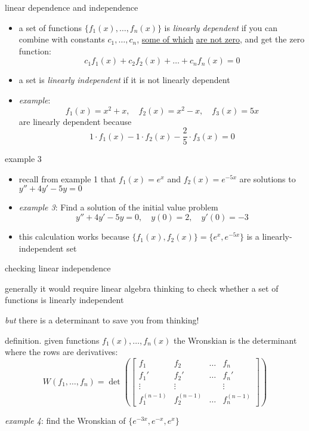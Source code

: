 \documentclass{beamer}
\begin{document}
\begin{frame}{linear dependence and independence}

\begin{itemize}
\item a set of functions $\{f_1(x),\dots,f_n(x)\}$ is \emph{linearly dependent} if you can combine with constants $c_1,\dots,c_n$, \underline{some of which} \underline{are not zero}, and get the zero function:
    $$c_1 f_1(x) + c_2 f_2(x) + \dots + c_n f_n(x) = 0$$
\item a set is \emph{linearly independent} if it is not linearly dependent
\item \emph{example}:
    $$f_1(x) = x^2 + x, \quad f_2(x) = x^2 - x, \quad f_3(x) = 5x$$
are linearly dependent because
    $$1\cdot f_1(x) - 1\cdot f_2(x) - \frac{2}{5}\cdot f_3(x) = 0$$
\end{itemize}
\end{frame}


\begin{frame}{example 3}

\begin{itemize}
\item recall from example 1 that $f_1(x)=e^x$ and $f_2(x)=e^{-5x}$ are solutions to $y'' + 4 y' - 5 y = 0$
\item \emph{example 3}:  Find a solution of the initial value problem
    $$y'' + 4 y' - 5 y = 0, \quad y(0) = 2, \quad y'(0) = -3$$

\vspace{35mm}
\item this calculation works because $\{f_1(x),f_2(x)\}=\{e^x,e^{-5x}\}$ is a linearly-independent set
\end{itemize}
\end{frame}


\begin{frame}{checking linear independence}

\begin{itemize}
\item generally it would require linear algebra thinking to check whether a set of functions is linearly independent
\item \emph{but} there is a \alert{determinant} to save you from thinking!
\item definition.  given functions $f_1(x),\dots,f_n(x)$ the \alert{Wronskian} is the determinant where the rows are derivatives:
    $$W(f_1,\dots,f_n) = \det \left(\begin{bmatrix}
    f_1 & f_2 & \dots & f_n \\
    f_1' & f_2' & \dots & f_n' \\
    \vdots & \vdots & & \vdots \\
    f_1^{(n-1)} & f_2^{(n-1)} & \dots & f_n^{(n-1)}
    \end{bmatrix}\right)$$
\begin{minipage}[t]{0.25\textwidth}
\item \emph{example 4}: find the Wronskian of $\{e^{-3x},e^{-x},e^{x}\}$
\end{minipage}

\vspace{15mm}
\end{itemize}
\end{frame}
\end{document}
